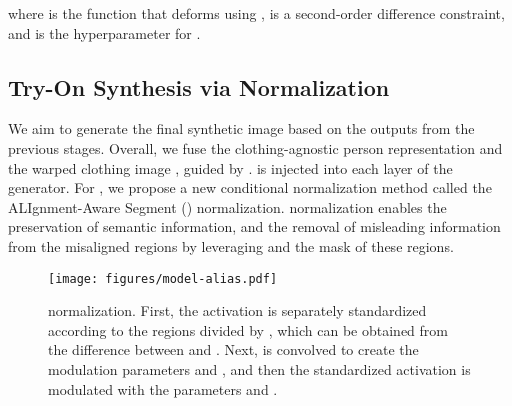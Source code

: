 where  is the function that deforms  using ,  is a second-order difference constraint, and  is the hyperparameter for .

\subsection{Try-On Synthesis via \norm Normalization}\label{sec:try-on synthesis}
We aim to generate the final synthetic image  based on the outputs from the previous stages.
Overall, we fuse the clothing-agnostic person representation  and the warped clothing image , guided by .
 is injected into each layer of the generator.
For , we propose a new conditional normalization method called the ALIgnment-Aware Segment (\norm) normalization.
\norm normalization enables the preservation of semantic information, and the removal of misleading information from the misaligned regions by leveraging  and the mask of these regions.

\begin{figure}[t!]
    \centering
    \texttt{[image: figures/model-alias.pdf]}
    \vspace{-0.5cm}
    \caption{\norm normalization.
    First, the activation is separately standardized according to the regions divided by , which can be obtained from the difference between  and .
    Next,  is convolved to create the modulation parameters  and , and then the standardized activation is modulated with the parameters  and .}
    \vspace{-0.4cm}
    \label{fig:alias norm}
\end{figure}

